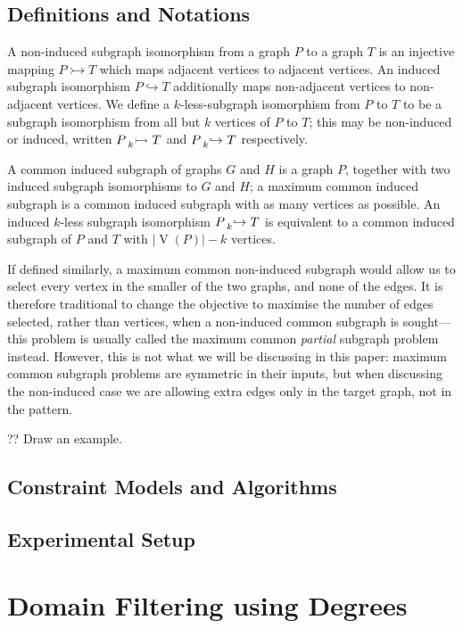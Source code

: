 \documentclass[letterpaper]{article}
\theoremstyle{definition}
\newcommand{\lessnonind}[1]{\prescript{}{#1}{\rightarrowtail}\ }
\newcommand{\lessind}[1]{\prescript{}{#1}{\hookrightarrow}\ }
\begin{document}
\subsection{Definitions and Notations}

A non-induced subgraph isomorphism from a graph $P$ to a graph $T$ is an injective mapping $P
\rightarrowtail T $ which maps adjacent vertices to adjacent vertices. An induced subgraph
isomorphism $P \hookrightarrow T$ additionally maps non-adjacent vertices to non-adjacent vertices.
We define a $k$-less-subgraph isomorphism from $P$ to $T$ to be a subgraph isomorphism from all but
$k$ vertices of $P$ to $T$; this may be non-induced or induced, written $P \lessnonind{k} T$ and $P
\lessind{k} T$ respectively.

A common induced subgraph of graphs $G$ and $H$ is a graph $P$, together with two induced subgraph
isomorphisms to $G$ and $H$; a maximum common induced subgraph is a common induced subgraph with as
many vertices as possible. An induced $k$-less subgraph isomorphism $P \lessind{k} T$ is equivalent
to a common induced subgraph of $P$ and $T$ with $|\operatorname{V}(P)| - k$ vertices.

If defined similarly, a maximum common non-induced subgraph would allow us to select every vertex in
the smaller of the two graphs, and none of the edges. It is therefore traditional to change the
objective to maximise the number of edges selected, rather than vertices, when a non-induced common
subgraph is sought---this problem is usually called the maximum common \emph{partial} subgraph
problem instead. However, this is not what we will be discussing in this paper: maximum common
subgraph problems are symmetric in their inputs, but when discussing the non-induced case we are
allowing extra edges only in the target graph, not in the pattern.

?? Draw an example.

\subsection{Constraint Models and Algorithms}

\subsection{Experimental Setup}

\section{Domain Filtering using Degrees}
\end{document}
